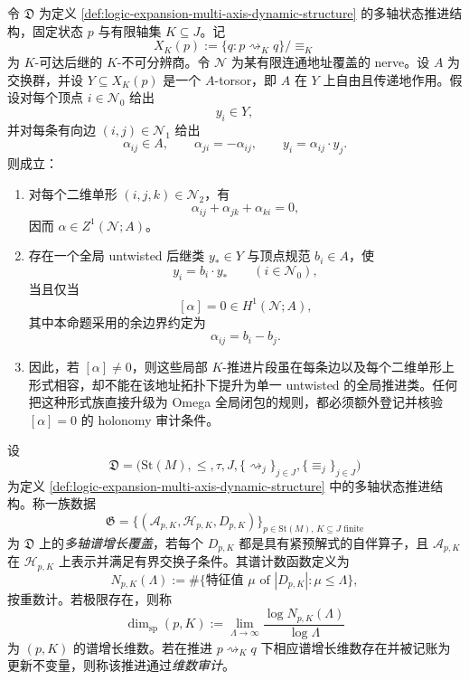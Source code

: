 \begin{theorem}\label{distill:gromov-formal_versus_genuine_realization_families-logic-effective-torsor-promotion}
令 \(\mathfrak D\) 为定义 \ref{def:logic-expansion-multi-axis-dynamic-structure} 的多轴状态推进结构，固定状态 \(p\) 与有限轴集 \(K\subseteq J\)。记
\[
X_K(p):=\{q:p\rightsquigarrow_K q\}/\equiv_K
\]
为 \(K\)-可达后继的 \(K\)-不可分辨商。令 \(\mathcal N\) 为某有限连通地址覆盖的 nerve。设 \(A\) 为交换群，并设 \(Y\subseteq X_K(p)\) 是一个 \(A\)-torsor，即 \(A\) 在 \(Y\) 上自由且传递地作用。假设对每个顶点 \(i\in\mathcal N_0\) 给出
\[
y_i\in Y,
\]
并对每条有向边 \((i,j)\in\mathcal N_1\) 给出
\[
\alpha_{ij}\in A,
\qquad
\alpha_{ji}=-\alpha_{ij},
\qquad
y_i=\alpha_{ij}\cdot y_j.
\]
则成立：
\begin{enumerate}
  \item 对每个二维单形 \((i,j,k)\in\mathcal N_2\)，有
  \[
  \alpha_{ij}+\alpha_{jk}+\alpha_{ki}=0,
  \]
  因而 \(\alpha\in Z^1(\mathcal N;A)\)。
  \item 存在一个全局 untwisted 后继类 \(y_\ast\in Y\) 与顶点规范 \(b_i\in A\)，使
  \[
  y_i=b_i\cdot y_\ast\qquad(i\in\mathcal N_0),
  \]
  当且仅当
  \[
  [\alpha]=0\in H^1(\mathcal N;A),
  \]
  其中本命题采用的余边界约定为
  \[
  \alpha_{ij}=b_i-b_j.
  \]
  \item 因此，若 \([\alpha]\ne0\)，则这些局部 \(K\)-推进片段虽在每条边以及每个二维单形上形式相容，却不能在该地址拓扑下提升为单一 untwisted 的全局推进类。任何把这种形式族直接升级为 Omega 全局闭包的规则，都必须额外登记并核验 \([\alpha]=0\) 的 holonomy 审计条件。
\end{enumerate}
\end{theorem}
\begin{definition}[多轴谱增长覆盖与维数审计]\label{distill:connes_spectral_triples_and_chamseddine_connes_spectral_action-commutative_reconstruction_schema-multiaxis-spectral-growth-cover}
设
\[
\mathfrak D
=
\bigl(\mathrm{St}(M),\le,\tau,J,\{\rightsquigarrow_j\}_{j\in J},\{\equiv_j\}_{j\in J}\bigr)
\]
为定义 \ref{def:logic-expansion-multi-axis-dynamic-structure} 中的多轴状态推进结构。称一族数据
\[
\mathfrak G=\{(\mathcal A_{p,K},\mathcal H_{p,K},D_{p,K})\}_{p\in\mathrm{St}(M),\,K\subseteq J\text{ finite}}
\]
为 \(\mathfrak D\) 上的\emph{多轴谱增长覆盖}，若每个 \(D_{p,K}\) 都是具有紧预解式的自伴算子，且 \(\mathcal A_{p,K}\) 在 \(\mathcal H_{p,K}\) 上表示并满足有界交换子条件。其谱计数函数定义为
\[
N_{p,K}(\Lambda):=\#\{\text{特征值 }\mu\text{ of }|D_{p,K}|:\mu\le\Lambda\},
\]
按重数计。若极限存在，则称
\[
\dim_{\mathrm{sp}}(p,K)
:=
\lim_{\Lambda\to\infty}\frac{\log N_{p,K}(\Lambda)}{\log\Lambda}
\]
为 \((p,K)\) 的谱增长维数。若在推进 \(p\rightsquigarrow_K q\) 下相应谱增长维数存在并被记账为更新不变量，则称该推进通过\emph{维数审计}。
\end{definition}

